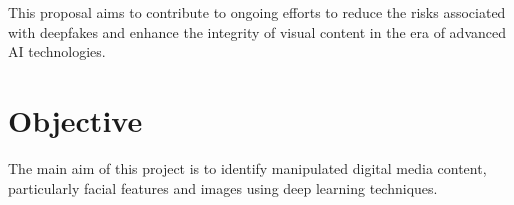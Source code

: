         This proposal aims to contribute to ongoing efforts to reduce the risks associated with deepfakes and enhance the integrity of visual content in the era of advanced AI technologies.

    \section{Objective}
        The main aim of this project is to identify manipulated digital media content, particularly facial features and images using deep learning techniques.